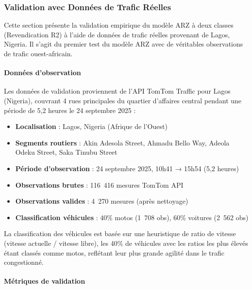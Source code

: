 
\subsubsection{Validation avec Données de Trafic Réelles}
\label{sec:validation_real_world}

Cette section présente la validation empirique du modèle ARZ à deux classes (Revendication R2) à l'aide de données de trafic réelles provenant de Lagos, Nigeria. Il s'agit du premier test du modèle ARZ avec de véritables observations de trafic ouest-africain.

\paragraph{Données d'observation}

Les données de validation proviennent de l'API TomTom Traffic pour Lagos (Nigeria), couvrant 4 rues principales du quartier d'affaires central pendant une période de 5,2 heures le 24 septembre 2025 :

\begin{itemize}
    \item \textbf{Localisation} : Lagos, Nigeria (Afrique de l'Ouest)
    \item \textbf{Segments routiers} : Akin Adesola Street, Ahmadu Bello Way, Adeola Odeku Street, Saka Tinubu Street
    \item \textbf{Période d'observation} : 24 septembre 2025, 10h41 → 15h54 (5,2 heures)
    \item \textbf{Observations brutes} : 116~416 mesures TomTom API
    \item \textbf{Observations valides} : 4~270 mesures (après nettoyage)
    \item \textbf{Classification véhicules} : 40\% motos (1~708 obs), 60\% voitures (2~562 obs)
\end{itemize}

La classification des véhicules est basée sur une heuristique de ratio de vitesse (vitesse actuelle / vitesse libre), les 40\% de véhicules avec les ratios les plus élevés étant classés comme motos, reflétant leur plus grande agilité dans le trafic congestionné.

\paragraph{Métriques de validation}

